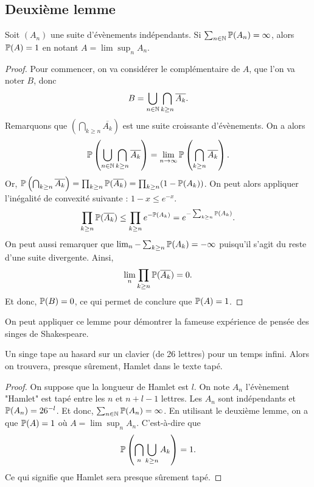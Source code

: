 \documentclass[../main.tex]{subfiles}
\begin{document}
\subsection*{Deuxième lemme}
\begin{lemma} Soit \((A_n)\) une suite d'évènements indépendants. Si \(\sum_{n\in\mathbb{N}}\mathbb{P}(A_n) = \infty\),
    alors \(\mathbb{P}(A) = 1\) en notant \(A = \lim\sup_n A_n\).
\end{lemma}
\begin{proof} Pour commencer, on va considérer le complémentaire de \(A\), que l'on va noter \(B\), donc
    \begin{equation}
        B = \bigcup_{n\in\mathbb{N}}\bigcap_{k\geq n} \overline{A_k}.
    \end{equation}
    Remarquons que \(\left(\bigcap_{k\geq n} \overline{A_k}\right)\) est une suite croissante d'évènements.
    On a alors
    \begin{equation}
        \mathbb{P}\left(\bigcup_{n\in\mathbb{N}}\bigcap_{k\geq n} \overline{A_k}\right) = \lim_{n\to\infty}\mathbb{P}\left(\bigcap_{k\geq n} \overline{A_k}\right).
    \end{equation}
    Or, \(\mathbb{P}\left(\bigcap_{k\geq n} \overline{A_k}\right) = \prod_{k\geq n} \mathbb{P}(\overline{A_k}) = \prod_{k\geq n} (1-\mathbb{P}(A_k))\).
    On peut alors appliquer l'inégalité de convexité suivante : \(1-x\le e^{-x}\).
    \begin{equation}
        \prod_{k\geq n} \mathbb{P}(\overline{A_k}) \le \prod_{k\geq n} e^{-\mathbb{P}(A_k)} = e^{-\sum_{k\geq n}\mathbb{P}(A_k)}.
    \end{equation}
    On peut aussi remarquer que \(\lim_n-\sum_{k\geq n}\mathbb{P}(A_k) = -\infty\) puisqu'il s'agit du
    reste d'une suite divergente. Ainsi,
    \begin{equation}
        \lim_n\prod_{k\geq n} \mathbb{P}(\overline{A_k}) = 0.
    \end{equation}
    Et donc, \(\mathbb{P}(B) = 0\), ce qui permet de conclure que \(\mathbb{P}(A) = 1\).
\end{proof}
On peut appliquer ce lemme pour démontrer la fameuse expérience de pensée 
des singes de Shakespeare.
\begin{proposition} Un singe tape au hasard sur un clavier (de 26 lettres) pour un temps infini.
    Alors on trouvera, presque sûrement, Hamlet dans le texte tapé.
\end{proposition}
\begin{proof}
    On suppose que la longueur de Hamlet est \(l\). On note \(A_n\) l'évènement "Hamlet" est tapé entre les \(n\) et \(n+l-1\) lettres. 
    Les \(A_n\) sont indépendants et \(\mathbb{P}(A_n) = 26^{-l}\). Et donc, \(\sum_{n\in\mathbb{N}}\mathbb{P}(A_n) = \infty\).
    En utilisant le deuxième lemme, on a que \(\mathbb{P}(A) = 1\) où \(A = \lim\sup_n A_n\). C'est-à-dire que 
    \begin{equation}
        \mathbb{P}\left(\bigcap_{n}\bigcup_{k\ge n}A_k\right) = 1.
    \end{equation}
    Ce qui signifie que Hamlet sera presque sûrement tapé.
\end{proof}
\end{document}
